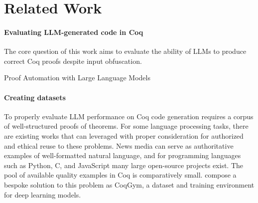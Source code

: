 
\section{Related Work}
\label{sec:related-work}

\paragraph{Evaluating LLM-generated code in Coq}

The core question of this work aims to evaluate
the ability of LLMs to produce correct Coq proofs
despite input obfuscation.

Proof Automation with Large Language Models\cite{proofautomationwithllms}



\paragraph
{Creating datasets}
To properly evaluate LLM performance on
Coq code generation requires a corpus of well-structured
proofs of theorems. For some language processing tasks,
there are existing works that can leveraged 
with proper consideration for authorized and ethical reuse
to these problems.
News media can serve as authoritative examples of
well-formatted natural language, and for programming
languages such as Python, C, and JavaScript many large
open-source projects exist.
The pool of available quality examples in Coq is
comparatively small.
\citet{learningtoprove} compose a bespoke solution
to this problem as CoqGym, a dataset and training
environment for deep learning models.



